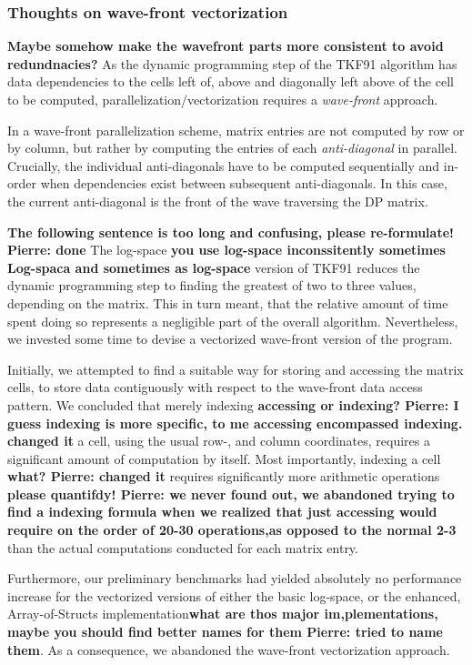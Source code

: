 \documentclass[runningheads,a4paper]{llncs}
\begin{document}
\subsubsection{Thoughts on wave-front vectorization}
{\bf Maybe somehow make the wavefront parts more consistent to avoid redundnacies?} 
As the dynamic programming step of the TKF91 algorithm has data dependencies to the cells left of, above and diagonally left above of the cell to be computed, 
parallelization/vectorization requires a \textit{wave-front} approach.

In a wave-front parallelization scheme, matrix entries are not computed by row or by column, but rather by computing the entries of each \textit{anti-diagonal} in parallel. 
Crucially, the individual anti-diagonals have to be computed sequentially and in-order when dependencies exist between subsequent anti-diagonals. 
In this case, the current anti-diagonal is the front of the wave traversing the DP matrix.

{\bf The following sentence is too long and confusing, please re-formulate! Pierre: done} The log-space {\bf you use log-space inconssitently sometimes Log-spaca and sometimes as log-space} 
version of TKF91 reduces the dynamic programming step to finding the greatest of two to three values, depending on the matrix. This in turn meant, that the relative amount of time spent doing so represents a negligible part of the overall algorithm. 
Nevertheless, we invested some time to devise a vectorized wave-front version of the program.

Initially, we attempted to find a suitable way for storing and accessing the matrix cells, 
to store data contiguously with respect to the wave-front data access pattern. 
We concluded that merely indexing {\bf accessing or indexing? Pierre: I guess indexing is more specific, to me accessing encompassed indexing. changed it} a cell, using the usual row-, and column coordinates, requires a significant amount of computation by itself. 
Most importantly, indexing a cell {\bf what? Pierre: changed it} requires significantly more arithmetic operations {\bf please quantifdy! Pierre: we never found out, we abandoned trying to find a indexing formula when we realized that just accessing would require on the order of 20-30 operations,as opposed to the normal 2-3} than the actual computations conducted for each matrix entry.

Furthermore, our preliminary benchmarks had yielded absolutely no performance increase for the vectorized versions of either the basic log-space, or the enhanced, Array-of-Structs implementation{\bf what are thos major im,plementations, maybe you 
should find better names for them Pierre: tried to name them}. 
As a consequence, we abandoned the wave-front vectorization approach.
\end{document}

